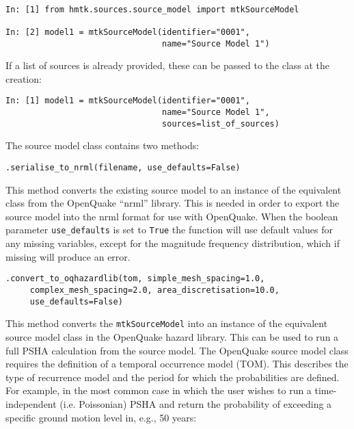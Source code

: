 \begin{Verbatim}[frame=single, commandchars=\\\{\}, fontsize=\scriptsize, samepage=true]

In: [1] from hmtk.sources.source_model import mtkSourceModel

In: [2] model1 = mtkSourceModel(identifier="0001",
                                name="Source Model 1")
\end{Verbatim}


If a list of sources is already provided, these can be passed to the class at the creation:

\begin{Verbatim}[frame=single, commandchars=\\\{\}, fontsize=\scriptsize, samepage=true]
In: [1] model1 = mtkSourceModel(identifier="0001",
                                name="Source Model 1",
                                sources=list_of_sources)
\end{Verbatim}

The source model class contains two methods:


\verb;.serialise_to_nrml(filename, use_defaults=False);

This method converts the existing source model to an instance of the equivalent class from the OpenQuake ``nrml'' library. This is needed in order to export the source model into the nrml format for use with OpenQuake. When the boolean parameter \verb=use_defaults= is set to \verb=True= the function will use default values for any missing variables, except for the magnitude frequency distribution, which if missing will produce an error.

\verb;.convert_to_oqhazardlib(tom, simple_mesh_spacing=1.0,;\\
\verb;     complex_mesh_spacing=2.0, area_discretisation=10.0,;\\
\verb;     use_defaults=False);

This method converts the \verb=mtkSourceModel= into an instance of the equivalent source model class in the OpenQuake hazard library. This can be used to run a full PSHA calculation from the source model. The OpenQuake source model class requires the definition of a temporal occurrence model (TOM). This describes the type of recurrence model and the period for which the probabilities are defined. For example, in the most common case in which the user wishes to run a time-independent (i.e. Poissonian) PSHA and return the probability of exceeding a specific ground motion level in, e.g., 50 years:

